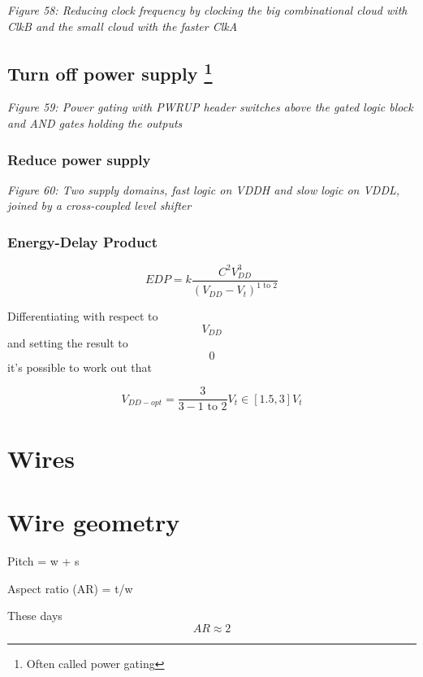 \emph{Figure 58: Reducing clock frequency by clocking the big
combinational cloud with ClkB and the small cloud with the faster ClkA}

\subsection[Turn off power supply ]{\texorpdfstring{Turn off power
supply
\footnote{Often called power gating}}{Turn off power supply }}\label{turn-off-power-supply-4}


{
\centering
{}
}

\emph{Figure 59: Power gating with PWRUP header switches above the gated
logic block and AND gates holding the outputs}

\subsubsection{Reduce power supply}\label{reduce-power-supply}


{
\centering
{}
}

\emph{Figure 60: Two supply domains, fast logic on VDDH and slow logic
on VDDL, joined by a cross-coupled level shifter}

\subsubsection{Energy-Delay Product}\label{energy-delay-product}

\[ EDP = k\frac{C^2 V_{DD}^3}{(V_{DD}- V_t)^{\text{1 to 2}}}\]

Differentiating with respect to \[V_{DD}\] and setting the result to
\[0\] it's possible to work out that

\[ V_{DD-opt} = \frac{3}{3-\text{1 to 2}}V_t  \in[1.5,3]V_{t}\]

\section{Wires}\label{wires}

\section{Wire geometry}\label{wire-geometry}

Pitch = w + s

Aspect ratio (AR) = t/w

These days \[AR \approx 2\]

